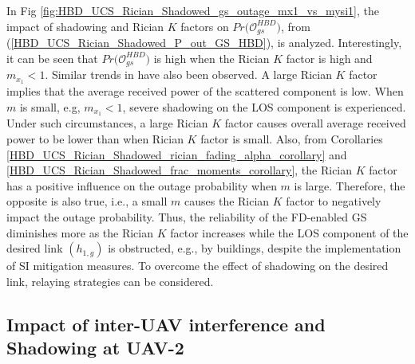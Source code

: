 In Fig \ref{fig:HBD_UCS_Rician_Shadowed_gs_outage_mx1_vs_mysi1}, the impact of shadowing and Rician $K$ factors on $Pr\big(\mathcal{O}_{gs}^{HBD}\big)$, from (\ref{HBD_UCS_Rician_Shadowed_P_out_GS_HBD}), is analyzed. Interestingly, it can be seen that $Pr\big(\mathcal{O}_{gs}^{HBD}\big)$ is high when the Rician $K$ factor is high and $m_{x_{1}} < 1$. Similar trends in \cite[Fig. 9]{kumar2017outage} have also been observed. A large Rician $K$ factor implies that the average received power of the scattered component is low. When $m$ is small, e.g, $m_{x_1} < 1$, severe shadowing on the LOS component is experienced. Under such circumstances, a large Rician $K$ factor causes overall average received power to be lower than when Rician $K$ factor is small. Also, from Corollaries \ref{HBD_UCS_Rician_Shadowed_rician_fading_alpha_corollary} and \ref{HBD_UCS_Rician_Shadowed_frac_moments_corollary}, the Rician $K$ factor has a positive influence on the outage probability when $m$ is large. Therefore, the opposite is also true, i.e., a small $m$ causes the Rician $K$ factor to negatively impact the outage probability. Thus, the reliability of the FD-enabled GS diminishes more as the Rician $K$ factor increases while the LOS component of the desired link $(h_{1,g})$ is obstructed, e.g., by buildings, despite the implementation of SI mitigation measures. To overcome the effect of shadowing on the desired link, relaying strategies can be considered.


\subsection{Impact of inter-UAV interference and Shadowing at UAV-2}
 
